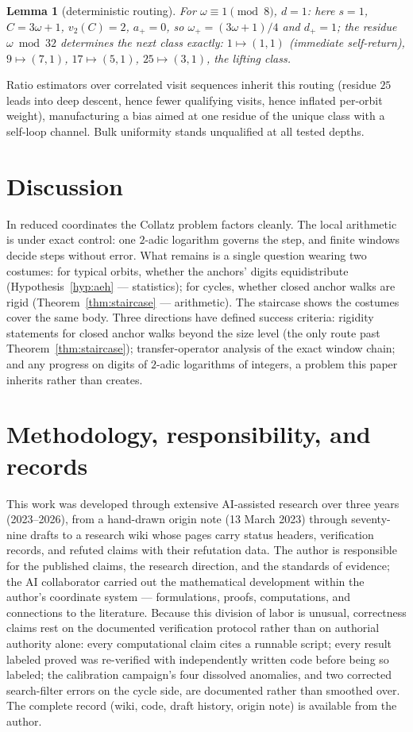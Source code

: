 \documentclass[11pt]{article}
\newtheorem{lemma}[theorem]{Lemma}
\theoremstyle{remark}
\newcommand{\vt}[1]{v_2\!\left(#1\right)}
\newcommand{\w}{\omega}
\newcommand{\wnext}{\w_{+}}
\newcommand{\dnext}{d_{+}}
\begin{document}
\begin{lemma}[deterministic routing]\label{lem:routing}
For $\w \equiv 1 \pmod 8$, $d = 1$: here $s = 1$, $C = 3\w + 1$, $\vt{C} = 2$, $a_+ = 0$, so $\wnext = (3\w+1)/4$ and $\dnext = 1$; the residue $\w \bmod 32$ determines the next class exactly: $1 \mapsto (1,1)$ (immediate self-return), $9 \mapsto (7,1)$, $17 \mapsto (5,1)$, $25 \mapsto (3,1)$, the lifting class.
\end{lemma}

Ratio estimators over correlated visit sequences inherit this routing (residue $25$ leads into deep descent, hence fewer qualifying visits, hence inflated per-orbit weight), manufacturing a bias aimed at one residue of the unique class with a self-loop channel. Bulk uniformity stands unqualified at all tested depths.

\section{Discussion}

In reduced coordinates the Collatz problem factors cleanly. The local arithmetic is under exact control: one $2$-adic logarithm governs the step, and finite windows decide steps without error. What remains is a single question wearing two costumes: for typical orbits, whether the anchors' digits equidistribute (Hypothesis~\ref{hyp:aeh} --- statistics); for cycles, whether closed anchor walks are rigid (Theorem~\ref{thm:staircase} --- arithmetic). The staircase shows the costumes cover the same body. Three directions have defined success criteria: rigidity statements for closed anchor walks beyond the size level (the only route past Theorem~\ref{thm:staircase}); transfer-operator analysis of the exact window chain; and any progress on digits of $2$-adic logarithms of integers, a problem this paper inherits rather than creates.

\appendix
\section{Methodology, responsibility, and records}\label{app:method}
This work was developed through extensive AI-assisted research over three years (2023--2026), from a hand-drawn origin note (13 March 2023) through seventy-nine drafts to a research wiki whose pages carry status headers, verification records, and refuted claims with their refutation data. The author is responsible for the published claims, the research direction, and the standards of evidence; the AI collaborator carried out the mathematical development within the author's coordinate system --- formulations, proofs, computations, and connections to the literature. Because this division of labor is unusual, correctness claims rest on the documented verification protocol rather than on authorial authority alone: every computational claim cites a runnable script; every result labeled proved was re-verified with independently written code before being so labeled; the calibration campaign's four dissolved anomalies, and two corrected search-filter errors on the cycle side, are documented rather than smoothed over. The complete record (wiki, code, draft history, origin note) is available from the author.
\end{document}
